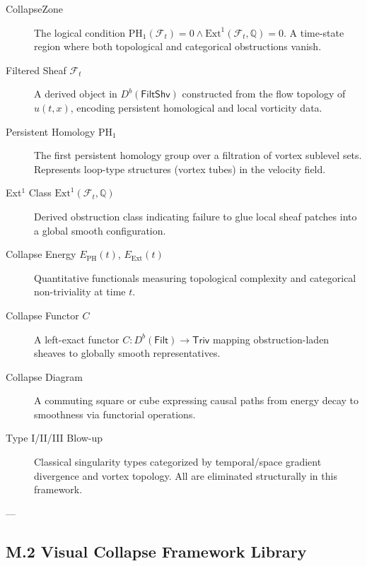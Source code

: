 \documentclass[11pt]{article}
\begin{document}
\begin{description}

  \item[CollapseZone]  
  The logical condition \( \mathrm{PH}_1(\mathcal{F}_t) = 0 \land \mathrm{Ext}^1(\mathcal{F}_t, \mathbb{Q}) = 0 \).  
  A time-state region where both topological and categorical obstructions vanish.

  \item[Filtered Sheaf \( \mathcal{F}_t \)]  
  A derived object in \( D^b(\mathsf{FiltShv}) \) constructed from the flow topology of \( u(t,x) \),  
  encoding persistent homological and local vorticity data.

  \item[Persistent Homology \( \mathrm{PH}_1 \)]  
  The first persistent homology group over a filtration of vortex sublevel sets.  
  Represents loop-type structures (vortex tubes) in the velocity field.

  \item[Ext$^1$ Class \( \mathrm{Ext}^1(\mathcal{F}_t, \mathbb{Q}) \)]  
  Derived obstruction class indicating failure to glue local sheaf patches into a global smooth configuration.

  \item[Collapse Energy \( E_{\mathrm{PH}}(t) \), \( E_{\mathrm{Ext}}(t) \)]  
  Quantitative functionals measuring topological complexity and categorical non-triviality at time \( t \).

  \item[Collapse Functor \( C \)]  
  A left-exact functor \( C : D^b(\mathsf{Filt}) \to \mathsf{Triv} \) mapping obstruction-laden sheaves to globally smooth representatives.

  \item[Collapse Diagram]  
  A commuting square or cube expressing causal paths from energy decay to smoothness via functorial operations.

  \item[Type I/II/III Blow-up]  
  Classical singularity types categorized by temporal/space gradient divergence and vortex topology.  
  All are eliminated structurally in this framework.

\end{description}

---

\subsection*{M.2 Visual Collapse Framework Library}
\end{document}
